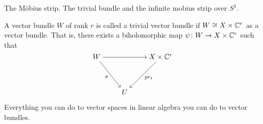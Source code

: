 \documentclass[11pt,a4paper]{article}
\begin{document}
\begin{example}
  The M\"obius strip.
  The trivial bundle and the infinite mobius strip over $S^1$.
\end{example}

\begin{definition}
  A vector bundle $W$ of rank $r$ is called a trivial vector bundle
  if $W \cong X \times \mathbb{C}^r$ as a vector bundle.
  That is, there exists a biholomorphic map $\psi \colon W \to X \times \mathbb{C}^r$
  such that
  \[\begin{tikzcd}[ampersand replacement=\&,cramped]
    W \&\& {X \times \C^r} \\
    \\
    \& U
    \arrow[from=1-1, to=1-3]
    \arrow["\pi"', from=1-1, to=3-2]
    \arrow["{pr_1}", from=1-3, to=3-2]
  \end{tikzcd}\]
\end{definition}

\begin{remark}
  Everything you can do to vector spaces in linear algebra you can do to vector
  bundles.
\end{remark}

\begin{definition}

\end{definition}


\end{document}
